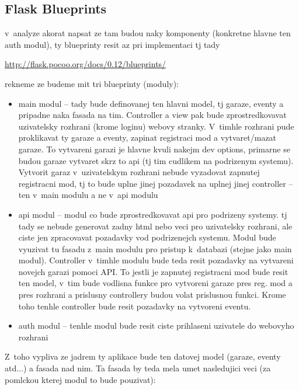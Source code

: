 \subsection{Flask Blueprints}

v~analyze akorat napsat ze tam budou naky komponenty (konkretne hlavne ten auth modul), ty blueprinty resit az pri implementaci tj tady

\url{http://flask.pocoo.org/docs/0.12/blueprints/}

rekneme ze budeme mit tri blueprinty (moduly):

\begin{itemize}
    \item main modul -- tady bude definovanej ten hlavni model, tj garaze, eventy a pripadne naka fasada na tim. Controller a view pak bude zprostredkovavat uzivatelsky rozhrani (krome loginu) webovy stranky. V~timhle rozhrani pude proklikavat ty garaze a eventy, zapinat registraci mod a vytvaret/mazat garaze. To vytvareni garazi je hlavne kvuli nakejm dev options, primarne se budou garaze vytvaret skrz to api (tj tim cudlikem na podrizenym systemu). Vytvorit garaz v~uzivatelskym rozhrani nebude vyzadovat zapnutej registracni mod, tj to bude uplne jinej pozadavek na uplnej jinej controller -- ten v~main modulu a ne v~api modulu
    \item api modul -- modul co bude zprostredkovavat api pro podrizeny systemy. tj tady se nebude generovat zadny html nebo veci pro uzivatelsky rozhrani, ale ciste jen zpracovavat pozadavky vod podrizenejch systemu. Modul bude vyuzivat tu fasadu z~main modulu pro pristup k~databazi (stejne jako main modul). Controller v~timhle modulu bude teda resit pozadavky na vytvareni novejch garazi pomoci API. To jestli je zapnutej registracni mod bude resit ten model, v~tim bude vodlisna funkce pro vytvoreni garaze pres reg. mod a pres rozhrani a prislusny controllery budou volat prislusnou funkci. Krome toho tenhle controller bude resit pozadavky na vytvoreni eventu.
    \item auth modul -- tenhle modul bude resit ciste prihlaseni uzivatele do webovyho rozhrani
\end{itemize}

Z~toho vypliva ze jadrem ty aplikace bude ten datovej model (garaze, eventy atd...) a fasada nad nim. Ta fasada by teda mela umet nasledujici veci (za pomlckou kterej modul to bude pouzivat):

